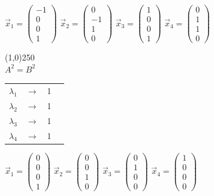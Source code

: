 \documentclass[12pt]{scrreprt}
\begin{document}
  \begin{center}
  $\vec{x}_1 = \begin{pmatrix}-1\\ 0 \\ 0 \\ 1 \end{pmatrix}$
  $\vec{x}_2 = \begin{pmatrix}0\\ -1 \\ 1 \\ 0 \end{pmatrix}$
  $\vec{x}_3 = \begin{pmatrix}1\\ 0 \\ 0 \\ 1 \end{pmatrix}$
  $\vec{x}_4 = \begin{pmatrix}0\\ 1 \\ 1 \\ 0 \end{pmatrix}$
  \end{center}

  \begin{center}
  \line(1,0){250}\\
  \textbf{$A^2 = B^2$}
  \end{center}

  \begin{center}
  \begin{tabular}{ c c c p{5cm} }
    $\lambda_1$ & $\rightarrow$ & 1 \\        
    $\lambda_2$ & $\rightarrow$ & 1 \\
    $\lambda_3$ & $\rightarrow$ & 1 \\
    $\lambda_4$ & $\rightarrow$ & 1 \\
  \end{tabular}
  \end{center}

  \begin{center}
  $\vec{x}_1 = \begin{pmatrix}0\\ 0 \\ 0 \\ 1 \end{pmatrix}$
  $\vec{x}_2 = \begin{pmatrix}0\\ 0 \\ 1 \\ 0 \end{pmatrix}$
  $\vec{x}_3 = \begin{pmatrix}0\\ 1 \\ 0 \\ 0 \end{pmatrix}$
  $\vec{x}_4 = \begin{pmatrix}1\\ 0 \\ 0 \\ 0 \end{pmatrix}$
  \end{center}
\end{document}
